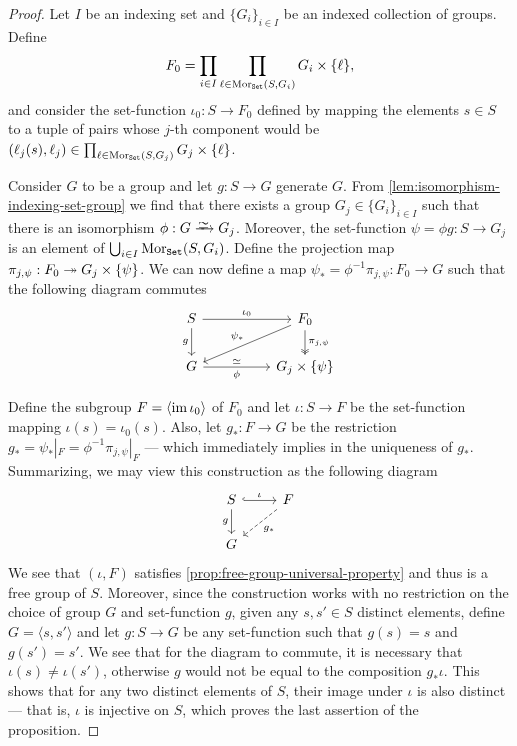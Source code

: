 \begin{proof}
Let \(I\) be an indexing set and \(\{G_{i}\}_{i \in I}\) be an indexed
collection of groups. Define
\[
  F_0 = \prod_{i \in I} \prod_{\ell \in \operatorname{Mor}_{{\texttt{Set}}}(S, G_i)} G_i \times \{\ell\},
\]
and consider the set-function \(\iota_0: S \to F_0\) defined by mapping the
elements \(s \in S\) to a tuple of pairs whose \(j\)-th component would be
\((\ell_j(s), \ell_j) \in \prod_{\ell \in \operatorname{Mor}_{{\texttt{Set}}}(S, G_j)} G_j \times
\{\ell\}\).

Consider \(G\) to be a group and let \(g: S \to G\) generate \(G\). From
\cref{lem:isomorphism-indexing-set-group} we find that there exists a group
\(G_j \in \{G_{i}\}_{i \in I}\) such that there is an isomorphism \(\phi: G
\isoto G_{j}\). Moreover, the set-function \(\psi = \phi g: S \to G_j\) is an
element of \(\bigcup_{i \in I} \operatorname{Mor}_{{\texttt{Set}}}(S, G_i)\). Define the projection map
\(\pi_{j, \psi}: F_0 \twoheadrightarrow G_j \times \{\psi\}\). We can now define a map
\(\psi_{*} = \phi^{-1} \pi_{j, \psi}: F_0 \to G\) such that the following
diagram commutes
\[
  \begin{tikzcd}
    S \ar[rr, "\iota_0"] \ar[d, swap, "g"]
      & &F_0 \ar[d, two heads, "\pi_{j, \psi}"]
    \ar[dll, swap, "\psi_{*}"] \\
    G \ar[rr, swap, "\phi", "\iso"'] & &G_j \times \{\psi\}
  \end{tikzcd}
\]

Define the subgroup \(F = \left\langle \operatorname{im} \iota_{0} \right\rangle\) of \(F_0\)
and let \(\iota: S \to F\) be the set-function mapping \(\iota(s) =
\iota_0(s)\). Also, let \(g_{*}: F \to G\) be the restriction \(g_{*} =
\psi_{*}|_{F} = \phi^{-1} \pi_{j, \psi}|_{F}\) --- which immediately implies in
the uniqueness of \(g_{*}\). Summarizing, we may view this construction as the
following diagram
\[
  \begin{tikzcd}
    S \ar[r, hook, "\iota"] \ar[d, swap, "g"] &F \ar[dl, dashed, "g_{*}"] \\
    G &
  \end{tikzcd}
\]
We see that \((\iota, F)\) satisfies \cref{prop:free-group-universal-property}
and thus is a free group of \(S\). Moreover, since the construction works with
no restriction on the choice of group \(G\) and set-function \(g\), given any
\(s, s' \in S\) distinct elements, define \(G = \langle s, s' \rangle\) and let
\(g: S \to G\) be any set-function such that \(g(s) = s\) and \(g(s') = s'\). We
see that for the diagram to commute, it is necessary that \(\iota(s) \neq
\iota(s')\), otherwise \(g\) would not be equal to the composition \(g_{*}
\iota\). This shows that for any two distinct elements of \(S\), their image
under \(\iota\) is also distinct --- that is, \(\iota\) is injective on \(S\),
which proves the last assertion of the proposition.
\end{proof}

